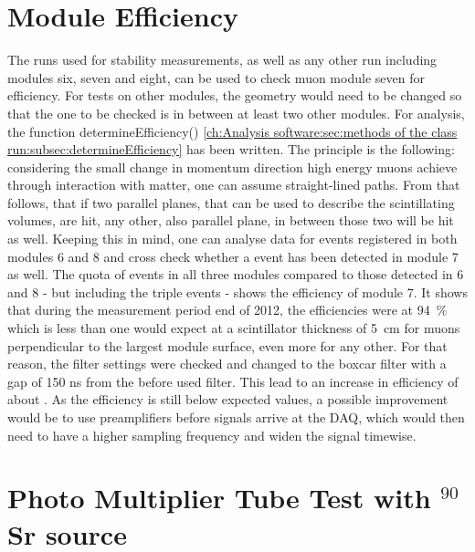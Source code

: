   \section{Module Efficiency}
  \label{ch:Analysis:sec:Module Efficiency}
  The runs used for stability measurements, as well as any other run including modules six, seven and eight, can be used to check muon module seven for efficiency. For tests on other modules, the geometry would need to be changed so that the one to be checked is in between at least two other modules.
  For analysis, the function determineEfficiency() \ref{ch:Analysis software:sec:methods of the class run:subsec:determineEfficiency}
  has been written.
  The principle is the following: considering the small change in momentum direction high energy muons achieve through interaction with matter, one can assume straight-lined paths. From that follows, that if two parallel planes, that can be used to describe the scintillating volumes, are hit, any other, also parallel plane, in between those two will be hit as well. Keeping this in mind, one can analyse data for events registered in both modules 6 and 8 and cross check whether a event has been detected in module 7 as well. The quota of events in all three modules compared to those detected in 6 and 8 - but including the triple events - shows the efficiency of module 7.
  It shows that during the measurement period end of 2012, the efficiencies were at  \SI{94 }{\percent} which is less than one would expect at a scintillator thickness of \SI{5}{\centi\meter} for muons perpendicular to the largest module surface, even more for any other.
  For that reason, the filter settings were checked and changed to the boxcar filter with a gap of 150 ns from the before used  filter. This lead to an increase in efficiency of about .
  As the efficiency is still below expected values, a possible improvement would be to use preamplifiers before signals arrive at the DAQ, which would then need to have a higher sampling frequency and widen the signal timewise.
  
  \section{Photo Multiplier Tube Test with $^{90}$Sr source} %
  \label{ch:Analysis:sec:PhotoMultiplierTests}
  
